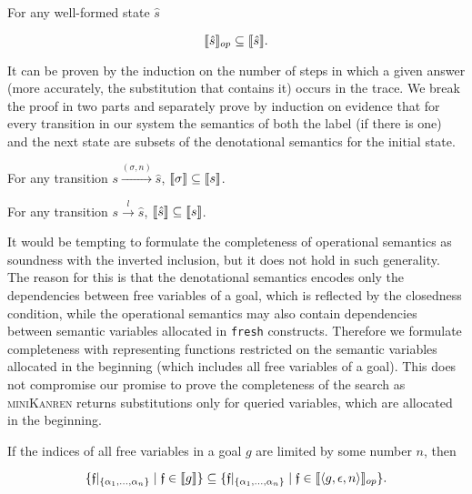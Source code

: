 \begin{lemma}
\label{lem:gen_soundness}
For any well-formed state $\hat{s}$

\[
\llbracket{\hat{s}}\rrbracket_{op} \subseteq \llbracket{\hat{s}}\rrbracket.
\]
\end{lemma}

It can be proven by the induction on the number of steps in which a given answer (more accurately, the substitution that contains it) occurs in the trace.
We break the proof in two parts and separately prove by induction on evidence that for every transition in our system the semantics of both the label (if there is one)
and the next state are subsets of the denotational semantics for the initial state.

\begin{lemma}
\label{lem:answer_soundness}
For any transition $s \xrightarrow{(\sigma, n)} \hat{s}$, \mbox{$\llbracket{\sigma}\rrbracket \subseteq \llbracket{s}\rrbracket$}.
\end{lemma}

\begin{lemma}
\label{lem:next_state_soundness}
For any transition $s \xrightarrow{l} \hat{s}$, \mbox{$\llbracket{\hat{s}}\rrbracket \subseteq \llbracket{s}\rrbracket$}.
\end{lemma}

It would be tempting to formulate the completeness of operational semantics as soundness with the inverted inclusion, but it does not hold in such generality.
The reason for this is that the denotational semantics encodes only the dependencies between free variables of a goal, which is reflected by the closedness condition,
while the operational semantics may also contain dependencies between semantic variables allocated in \lstinline|fresh| constructs. Therefore we formulate completeness
with representing functions restricted on the semantic variables allocated in the beginning (which includes all free variables of a goal). This does not
compromise our promise to prove the completeness of the search as \textsc{miniKanren} returns substitutions only for queried variables,
which are allocated in the beginning.

\begin{theorem}
If the indices of all free variables in a goal $g$ are limited by some number $n$, then

\[
\{\mathfrak{f}|_{\{\alpha_1,\dots,\alpha_n\}} \mid \mathfrak{f} \in \llbracket{g}\rrbracket\} \subseteq \{\mathfrak{f}|_{\{\alpha_1,\dots,\alpha_n\}} \mid \mathfrak{f} \in \llbracket{\left<{g, \epsilon, n}\right>}\rrbracket_{op}\}.
\]
\end{theorem}

